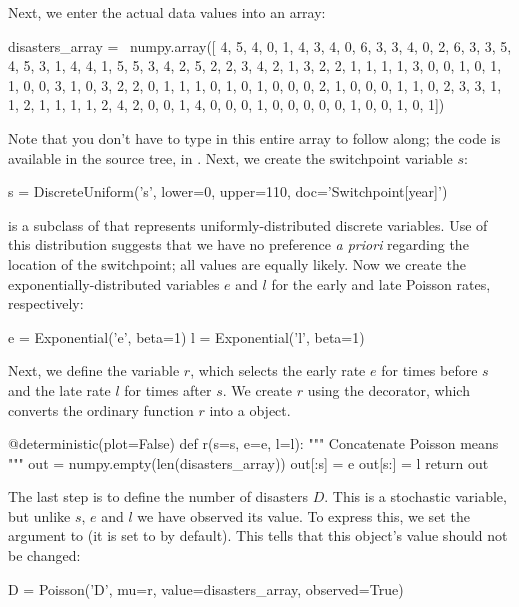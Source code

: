 \documentclass[]{jss}
\begin{document}
Next, we enter the actual data values into an array:
\begin{CodeInput}
disasters_array =   \
     numpy.array([ 4, 5, 4, 0, 1, 4, 3, 4, 0, 6, 3, 3, 4, 0, 2, 6,
                   3, 3, 5, 4, 5, 3, 1, 4, 4, 1, 5, 5, 3, 4, 2, 5,
                   2, 2, 3, 4, 2, 1, 3, 2, 2, 1, 1, 1, 1, 3, 0, 0,
                   1, 0, 1, 1, 0, 0, 3, 1, 0, 3, 2, 2, 0, 1, 1, 1,
                   0, 1, 0, 1, 0, 0, 0, 2, 1, 0, 0, 0, 1, 1, 0, 2,
                   3, 3, 1, 1, 2, 1, 1, 1, 1, 2, 4, 2, 0, 0, 1, 4,
                   0, 0, 0, 1, 0, 0, 0, 0, 0, 1, 0, 0, 1, 0, 1])
\end{CodeInput}
Note that you don't have to type in this entire array to follow along; the code is available in the source tree, in .  Next, we create the switchpoint variable $s$:
\begin{CodeInput}
s = DiscreteUniform('s', lower=0, upper=110, doc='Switchpoint[year]')
\end{CodeInput}
 is a subclass of  that represents uniformly-distributed discrete variables. Use of this distribution suggests that we have no preference \emph{a priori} regarding the location of the switchpoint; all values are equally likely. Now we create the exponentially-distributed variables $e$ and $l$ for the early and late Poisson rates, respectively:
\begin{CodeInput}
e = Exponential('e', beta=1)
l = Exponential('l', beta=1)
\end{CodeInput}
Next, we define the variable $r$, which selects the early rate $e$ for times before $s$ and the late rate $l$ for times after $s$. We create $r$ using the  decorator, which converts the ordinary  function $r$ into a  object.
\begin{CodeInput}
@deterministic(plot=False)
def r(s=s, e=e, l=l):
    """ Concatenate Poisson means """
    out = numpy.empty(len(disasters_array))
    out[:s] = e
    out[s:] = l
    return out
\end{CodeInput}
The last step is to define the number of disasters $D$. This is a stochastic variable, but unlike $s$, $e$ and $l$ we have observed its value. To express this, we set the argument  to  (it is set to  by default). This tells  that this object's value should not be changed:
\begin{CodeInput}
D = Poisson('D', mu=r, value=disasters_array, observed=True)
\end{CodeInput}
\end{document}
